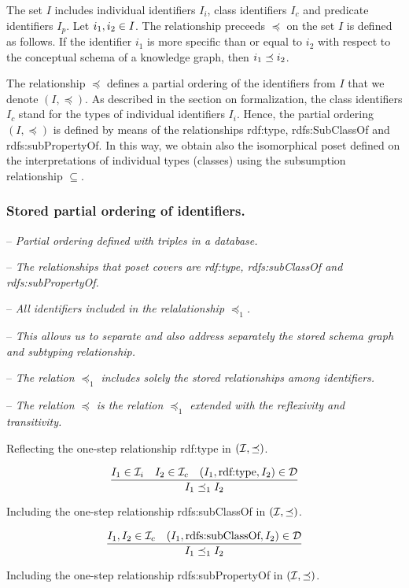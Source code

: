 \documentclass[runningheads]{llncs}
\newcommand{\D}{{\cal D}}
\newcommand{\I}{{\cal I}}
\newcommand{\Ii}{{\cal I}_i}
\newcommand{\Ic}{{\cal I}_c}
\newcommand{\nl}{\hfill\break}
\newcommand{\notes}[1]{\noindent\begin{small}-- \emph{#1}\\\end{small}}
\begin{document}
The set $I$ includes individual identifiers $I_i$, class identifiers
$I_c$ and predicate identifiers $I_p$. Let $i_1,i_2\in\/I$. The
relationship preceeds $\preceq$ on the set $I$ is defined as
follows. If the identifier $i_1$ is more specific than or equal to
$i_2$ with respect to the conceptual schema of a knowledge graph, then
$i_1\preceq\/i_2$.

The relationship $\preceq$ defines a partial ordering of the
identifiers from $I$ that we denote $(I,\preceq)$. As described in the
section on formalization, the class identifiers $I_c$ stand for the
types of individual identifiers $I_i$. Hence, the partial ordering
$(I,\preceq)$ is defined by means of the relationships
rdf:type, rdfs:SubClassOf and rdfs:subPropertyOf. In this way, we
obtain also the isomorphical poset defined on the interpretations of
individual types (classes) using the subsumption relationship
$\subseteq$.


\subsubsection{Stored partial ordering of identifiers.}\nl

\notes{Partial ordering defined with triples in a database.}
\notes{The relationships that poset covers are rdf:type, rdfs:subClassOf and rdfs:subPropertyOf. }
\notes{All identifiers included in the relalationship $\preceq_1$.}
\notes{This allows us to separate and also address separately the stored schema graph and subtyping relationship.}
\notes{The relation $\preceq_1$ includes solely the \emph{stored} relationships among identifiers.}
\notes{The relation $\preceq$ is the relation $\preceq_1$ extended with the reflexivity and transitivity.}

\noindent Reflecting the one-step relationship rdf:type in $(\I,\preceq)$. 

\begin{equation}
\dfrac{I_1\in\Ii \quad I_2\in\Ic \quad (I_1,\text{rdf:type},I_2)\in \D}
      {I_1 \preceq_1 I_2}
\end{equation}

\noindent Including the one-step relationship rdfs:subClassOf in
$(\I,\preceq)$.

\begin{equation}
\dfrac{I_1,I_2\in\Ic \quad (I_1,\text{rdfs:subClassOf},I_2)\in \D}
      {I_1 \preceq_1 I_2}
\end{equation}

\noindent Including the one-step relationship rdfs:subPropertyOf in
$(\I,\preceq)$.
\end{document}
